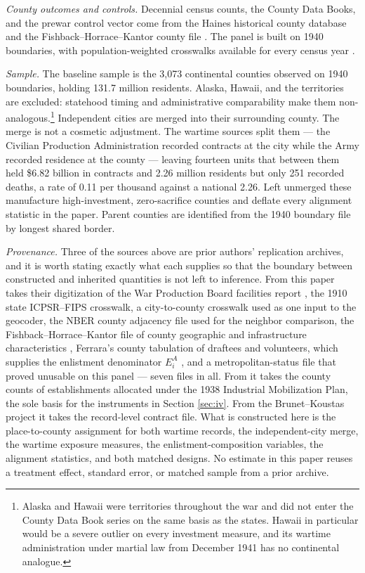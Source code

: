 \documentclass[12pt]{article}
\newcommand{\parencite}[1]{\citep{#1}}
\newcommand{\textcite}[1]{\citet{#1}}
\begin{document}
\noindent\emph{County outcomes and controls.} Decennial census counts, the
County Data Books, and the prewar control vector come from the Haines historical
county database and the Fishback--Horrace--Kantor county file
\parencite{haines2010,fhk2005}. The panel is built on 1940 boundaries, with
population-weighted crosswalks available for every census year
\parencite{ferraracrosswalk2024}.

\noindent\emph{Sample.} The baseline sample is the 3{,}073 continental counties
observed on 1940 boundaries, holding 131.7 million residents. Alaska, Hawaii,
and the territories are excluded: statehood timing and administrative
comparability make them non-analogous.\footnote{Alaska and Hawaii were territories throughout the war and did not enter the County Data Book series on the same basis as the states. Hawaii in particular would be a severe outlier on every investment measure, and its wartime administration under martial law from December 1941 has no continental analogue.} Independent cities are merged into their
surrounding county. The merge is not a cosmetic adjustment. The wartime
sources split them --- the
Civilian Production Administration recorded contracts at the city while the Army
recorded residence at the county --- leaving fourteen units that between them
held \$6.82 billion in contracts and 2.26 million residents but only 251
recorded deaths, a rate of 0.11 per thousand against a national 2.26. Left
unmerged these manufacture high-investment, zero-sacrifice counties and deflate
every alignment statistic in the paper. Parent counties are identified from the
1940 boundary file by longest shared border.

\noindent\emph{Provenance.} Three of the sources above are prior authors'
replication archives, and it is worth stating exactly what each supplies so that
the boundary between constructed and inherited quantities is not left to
inference. From \textcite{garin2025} this paper takes their
digitization of the War Production Board facilities report \parencite{wpbFacilities1945},
the 1910 state ICPSR--FIPS crosswalk, a city-to-county crosswalk used as one
input to the geocoder, the NBER county adjacency file used for the neighbor
comparison, the Fishback--Horrace--Kantor file of county geographic and
infrastructure characteristics \parencite{fhk2005}, Ferrara's county tabulation of
draftees and volunteers, which supplies the enlistment denominator $E_i^{A}$
\parencite{ferrara2022}, and a metropolitan-status file that proved unusable on
this panel --- seven files in all. From
\textcite{jaworski2017} it takes the county counts of establishments allocated
under the 1938 Industrial Mobilization Plan, the sole basis for the instruments
in Section \ref{sec:iv}. From the
Brunet--Koustas project \parencite{brunet2017} it takes the record-level
contract file. What is constructed here is the place-to-county assignment for
both wartime records, the independent-city merge, the wartime exposure measures,
the enlistment-composition variables, the alignment statistics, and both matched
designs. No estimate in this paper reuses a treatment effect, standard error, or
matched sample from a prior archive.
\end{document}
